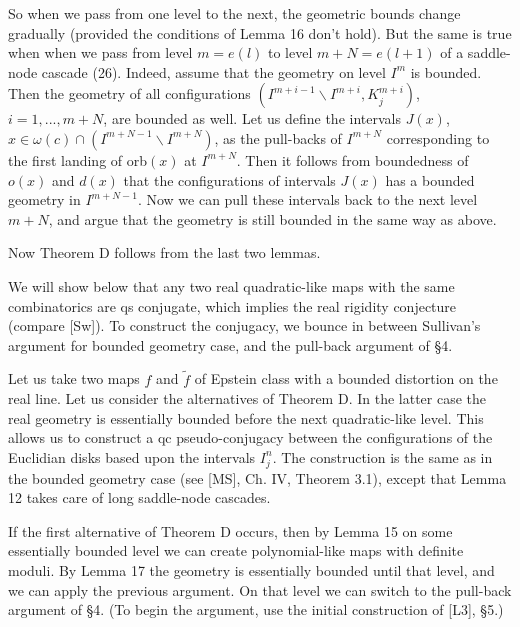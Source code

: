   So when we pass from one level to the next, the  geometric bounds
change gradually (provided the conditions of Lemma 16 don't hold).
But the same is true when when we pass from level $m=e(l)$ to level
 $m+N=e(l+1)$
of a saddle-node cascade (26). Indeed, assume that the geometry on level
$I^m$ is bounded. Then the geometry of all configurations 
$(I^{m+i-1}\backslash I^{m+i}, K^{m+i}_j)$, $i=1,...,m+N$, are bounded as well.
Let us define the intervals $J(x)$,
 $x\in\omega(c)\cap (I^{m+N-1}\backslash I^{m+N})$, as 
the pull-backs of $I^{m+N}$ corresponding to the first landing of orb$(x)$
at $I^{m+N}$. Then it follows from boundedness of $o(x)$ and $d(x)$ that
the configurations of intervals $J(x)$ has a bounded geometry in $I^{m+N-1}$. 
Now we can pull these intervals  back to the next level $m+N$, and
argue that the geometry is still bounded in the same way as above.  \QED 

Now Theorem D follows from the last two lemmas.
    
  
 
 
\medskip{}
We will show below that any two real quadratic-like maps with the same
combinatorics are qs conjugate, which implies the real rigidity
conjecture (compare [Sw]). To construct the conjugacy,
we bounce in between Sullivan's argument
for bounded geometry case, and the pull-back
argument of \S 4.
 
Let us take two maps $f$ and $\tilde f$ of Epstein class
with a  bounded distortion on the real line.
Let us consider the alternatives of Theorem D. In the latter case
  the real geometry is essentially bounded before the next quadratic-like level.
This allows us to construct a qc pseudo-conjugacy between the configurations
of the Euclidian disks based upon the intervals $I^n_j$.
 The construction is the same as in the bounded geometry case
(see [MS], Ch. IV, Theorem 3.1), 
except that Lemma 12 takes care of
 long saddle-node cascades.
 
 
If the first alternative of Theorem D occurs, then by Lemma 15
on some essentially bounded level
we can create  polynomial-like maps with definite moduli.
 By Lemma 17  the geometry is essentially bounded until that level, and
we can apply the previous argument. On that level we can switch 
to the pull-back argument of \S 4. (To begin the
argument, use the initial construction of [L3], \S 5.) 
 
